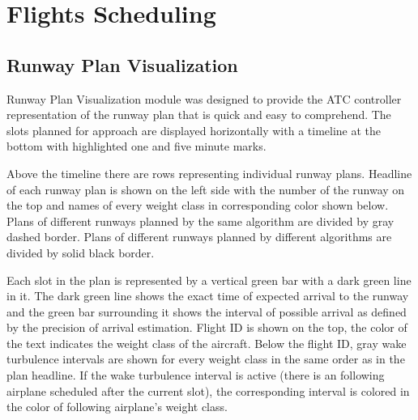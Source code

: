 
\chapter{Flights Scheduling}




\section{Runway Plan Visualization}

\label{section:runway-visualization}

Runway Plan Visualization module was designed to provide the ATC controller representation of the runway plan that is quick and easy to comprehend. The slots planned for approach are displayed horizontally with a timeline at the bottom with highlighted one and five minute marks.

Above the timeline there are rows representing individual runway plans. Headline of each runway plan is shown on the left side with the number of the runway on the top and names of every weight class in corresponding color shown below. Plans of different runways planned by the same algorithm are divided by gray dashed border. Plans of different runways planned by different algorithms are divided by solid black border.

Each slot in the plan is represented by a vertical green bar with a dark green line in it. The dark green line shows the exact time of expected arrival to the runway and the green bar surrounding it shows the interval of possible arrival as defined by the precision of arrival estimation. Flight ID is shown on the top, the color of the text indicates the weight class of the aircraft. Below the flight ID, gray wake turbulence intervals are shown for every weight class in the same order as in the plan headline. If the wake turbulence interval is active (there is an following airplane scheduled after the current slot), the corresponding interval is colored in the color of following airplane's weight class.

